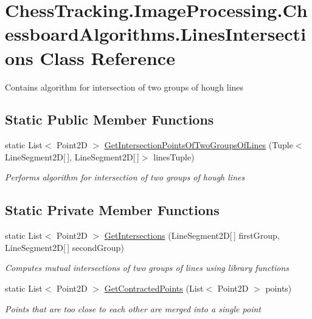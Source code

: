 \hypertarget{class_chess_tracking_1_1_image_processing_1_1_chessboard_algorithms_1_1_lines_intersections}{}\section{Chess\+Tracking.\+Image\+Processing.\+Chessboard\+Algorithms.\+Lines\+Intersections Class Reference}
\label{class_chess_tracking_1_1_image_processing_1_1_chessboard_algorithms_1_1_lines_intersections}


Contains algorithm for intersection of two groups of hough lines  


\subsection*{Static Public Member Functions}
\begin{DoxyCompactItemize}
\item 
static List$<$ Point2D $>$ \mbox{\hyperlink{class_chess_tracking_1_1_image_processing_1_1_chessboard_algorithms_1_1_lines_intersections_a238bd64915ed229a46fb7cb42fac41d4}{Get\+Intersection\+Points\+Of\+Two\+Groups\+Of\+Lines}} (Tuple$<$ Line\+Segment2D\mbox{[}$\,$\mbox{]}, Line\+Segment2D\mbox{[}$\,$\mbox{]}$>$ lines\+Tuple)
\begin{DoxyCompactList}\small\item\em Performs algorithm for intersection of two groups of hough lines \end{DoxyCompactList}\end{DoxyCompactItemize}
\subsection*{Static Private Member Functions}
\begin{DoxyCompactItemize}
\item 
static List$<$ Point2D $>$ \mbox{\hyperlink{class_chess_tracking_1_1_image_processing_1_1_chessboard_algorithms_1_1_lines_intersections_a81062447dc3aa5df1b32354243bd885a}{Get\+Intersections}} (Line\+Segment2D\mbox{[}$\,$\mbox{]} first\+Group, Line\+Segment2D\mbox{[}$\,$\mbox{]} second\+Group)
\begin{DoxyCompactList}\small\item\em Computes mutual intersections of two groups of lines using library functions \end{DoxyCompactList}\item 
static List$<$ Point2D $>$ \mbox{\hyperlink{class_chess_tracking_1_1_image_processing_1_1_chessboard_algorithms_1_1_lines_intersections_acf74847d28cfb6128d4dab5876f1b439}{Get\+Contracted\+Points}} (List$<$ Point2D $>$ points)
\begin{DoxyCompactList}\small\item\em Points that are too close to each other are merged into a single point \end{DoxyCompactList}\end{DoxyCompactItemize}



